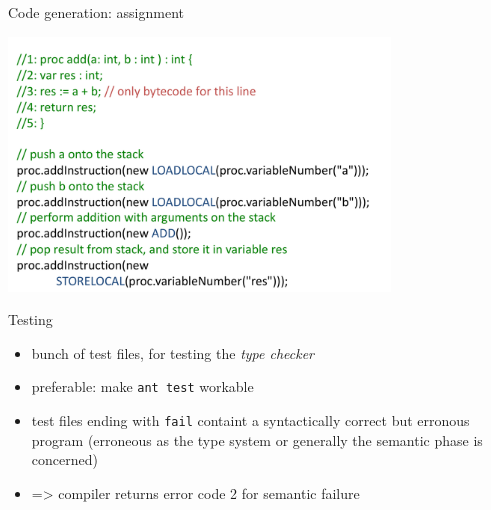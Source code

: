 \documentclass{beamer}
\begin{document}
\begin{frame}[label={sec:org57f870a}]{Code generation: assignment}
\begin{center}
 \includegraphics[width=0.76\textwidth]{figures/snaps/codegen-assignment}
\end{center}
\end{frame}



\begin{frame}[label={sec:org717b5bd},fragile]{Testing}
 \begin{itemize}
\item bunch of test files, for testing the \emph{type checker}
\item preferable: make \texttt{ant test} workable

\item test files ending with \texttt{fail} containt a syntactically correct but
erronous program (erroneous as the type system or generally the semantic
phase is concerned)

\item => compiler returns error code 2 for semantic failure
\end{itemize}
\end{frame}
\end{document}
